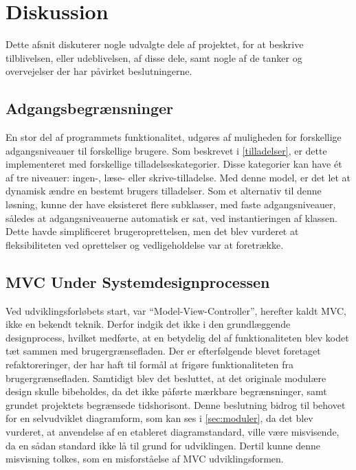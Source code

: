 \chapter{Diskussion}
\label{cha:diskussion}

Dette afsnit diskuterer nogle udvalgte dele af projektet, for at beskrive tilblivelsen, eller udeblivelsen, af disse dele, samt nogle af de tanker og overvejelser der har påvirket beslutningerne.

\section{Adgangsbegrænsninger}

En stor del af programmets funktionalitet, udgøres af muligheden for forskellige adgangsniveauer til forskellige brugere. Som beskrevet i \cref{tilladelser}, er dette implementeret med forskellige tilladelseskategorier. Disse kategorier kan have ét af tre niveauer: ingen-, læse- eller skrive-tilladelse. Med denne model, er det let at dynamisk ændre en bestemt brugers tilladelser. Som et alternativ til denne løsning, kunne der have eksisteret flere subklasser, med faste adgangsniveauer, således at adgangsniveauerne automatisk er sat, ved instantieringen af klassen. Dette havde simplificeret brugeroprettelsen, men det blev vurderet at fleksibiliteten ved oprettelser og vedligeholdelse var at foretrække.

\section{MVC Under Systemdesignprocessen}

Ved udviklingsforløbets start, var \enquote{Model-View-Controller}, herefter kaldt MVC, ikke en bekendt teknik. Derfor indgik det ikke i den grundlæggende designprocess, hvilket medførte, at en betydelig del af funktionaliteten blev kodet tæt sammen med brugergrænsefladen. Der er efterfølgende blevet foretaget refaktoreringer, der har haft til formål at frigøre funktionaliteten fra brugergrænsefladen. Samtidigt blev det besluttet, at det originale modulære design skulle bibeholdes, da det ikke påførte mærkbare begrænsninger, samt grundet projektets begrænsede tidshorisont. Denne beslutning bidrog til behovet for en selvudviklet diagramform, som kan ses i \cref{sec:moduler}, da det blev vurderet, at anvendelse af en etableret diagramstandard, ville være misvisende, da en sådan standard ikke lå til grund for udviklingen. Dertil kunne denne misvisning tolkes, som en misforståelse af MVC udviklingsformen.

